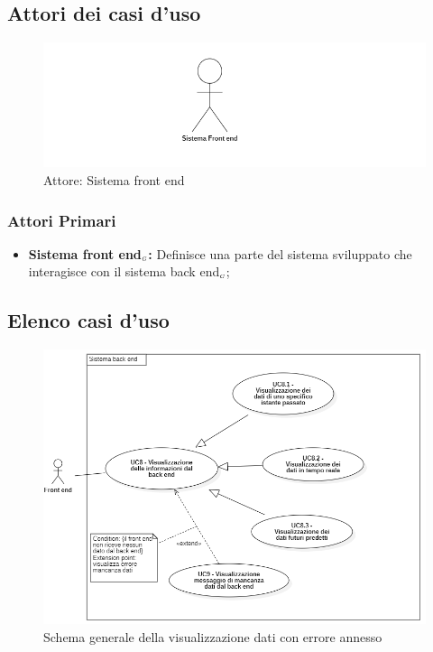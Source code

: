\subsection{Attori dei casi d'uso}\label{CasiDUsoCasiDUsoTraIlFrontEndEIlBackEndAttoriDeiCasiDUso}
\begin{center}
	\begin{figure}[H]
		\centering\includegraphics{../immagini/attori_casi/sistema_front_end.png}
		\caption{Attore: Sistema front end}
	\end{figure}
\end{center}
\subsubsection{Attori Primari}\label{CasiDUsoCasiDUsoTraIlFrontEndEIlBackEndAttoriDeiCasiDUsoAttoriPrimari}
\begin{itemize}
	\item \textbf{Sistema front end$_{\scaleto{G}{3pt}}$:} Definisce una parte del sistema sviluppato che interagisce con il sistema back end$_{\scaleto{G}{3pt}}$;
\end{itemize}

\subsection{Elenco casi d'uso}\label{CasiDUsoCasiDUsoTraIlFrontEndEIlBackEndElencoDeiCasiDUso}


\begin{center}
	\begin{figure}[H]
		\centering\includegraphics[scale=0.7]{../immagini/attori_casi/UC8.png}
		\caption{Schema generale della visualizzazione dati con errore annesso}
	\end{figure}
\end{center}

